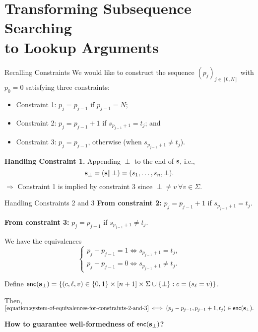 \section{Transforming Subsequence Searching\\ to Lookup Arguments}
\begin{frame}{Recalling Constraints}
	We would like to construct the sequence $(p_j)_{j \in [0, N]}$ with $p_0 = 0$ satisfying three constraints:
	\begin{itemize}
		\item Constraint 1: $p_j = p_{j - 1}$ if $p_{j - 1} = N$;\\
		\item Constraint 2: $p_j = p_{j - 1} + 1$ if $s_{p_{j - 1} + 1} = t_j$; and\\
		\item Constraint 3: $p_j = p_{j - 1}$, otherwise (when $s_{p_{j - 1} + 1} \not= t_j$).
	\end{itemize}
	
	\textbf{Handling Constraint 1.} Appending $\perp$ to the end of $\mathbf{s}$, i.e.,
	\begin{equation*}
		\mathbf{s}_\perp = (\mathbf{s}\Vert\!\perp) = (s_1, \dots, s_n, \perp).
	\end{equation*}
	$\Rightarrow$ Constraint 1 is implied by constraint 3 since $\perp \not= v~\forall v \in \Sigma$.
\end{frame}
\begin{frame}{Handling Constraints 2 and 3}
	\textbf{From constraint 2:} $p_j = p_{j - 1} + 1$ if $s_{p_{j - 1} + 1} = t_j$.
	
	\textbf{From constraint 3:} $p_j = p_{j - 1}$ if $s_{p_{j - 1} + 1} \not= t_j$.
	
	We have the equivalences
	\begin{equation}\label{equation:system-of-equivalences-for-constraints-2-and-3}
		\begin{cases}
			p_j - p_{j - 1} = 1 \iff s_{p_{j - 1} + 1} = t_j,\\ 
			p_j - p_{j - 1} = 0 \iff s_{p_{j - 1} + 1} \not= t_j.
		\end{cases}
	\end{equation}
	
	Define $\mathsf{enc}(\mathbf{s}_\perp)  = \{(c, \ell, v) \in \{0,1\}\times[n+1]\times\Sigma\cup\{\perp\} : c = (s_\ell = v)\}$.
	
	Then,
	$
		\eqref{equation:system-of-equivalences-for-constraints-2-and-3} \iff (p_j - p_{j - 1}, p_{j - 1} + 1, t_j) \in \mathsf{enc}(\mathbf{s}_\perp).
	$
	
	\begin{center}
		\textbf{How to guarantee well-formedness of $\mathsf{enc}(\mathbf{s}_\perp)$?}
	\end{center}
\end{frame}

